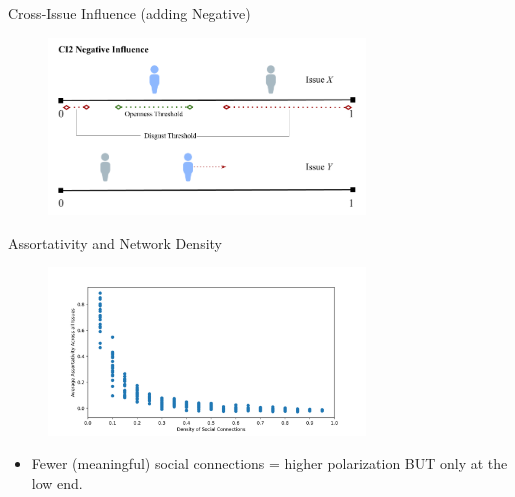 \documentclass[12pt]{beamer}
\begin{document}
\begin{frame}[c]{Cross-Issue Influence (adding Negative)}  %



\begin{figure}
	\includegraphics[width=0.75\textwidth]{images/CI2Repulsion.png}
\end{figure}

\end{frame}

\begin{frame}[c]{Assortativity and Network Density}  %

\begin{figure}
	\includegraphics[width=0.75\textwidth]{images/Assort_edge.png}

\end{figure}

\small
\begin{itemize}
\itemsep.1em
\item Fewer (meaningful) social connections = higher polarization BUT only at the low end.
\end{itemize}

\end{frame}
\end{document}
